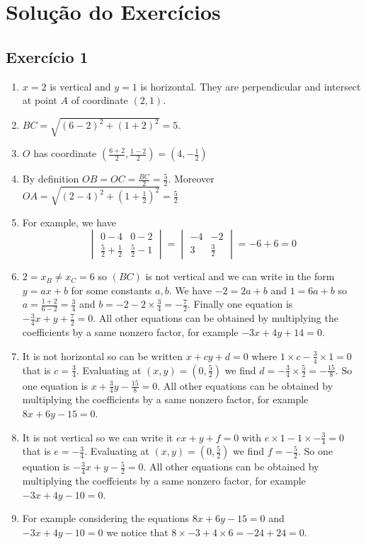 \section{Solução do Exercícios}

\subsection*{Exercício 1}

\begin{enumerate}
\item $x=2$ is vertical and $y=1$ is horizontal. They are perpendicular
  and intersect at point $A$ of coordinate $(2,1)$.
\item $BC= \sqrt{{(6-2)}^2 + {(1+2)}^2} = 5$.
\item
  $O$ has coordinate $\left(\frac{6+2}{2}, \frac{1-2}{2}\right)=
  \left(4, -\frac{1}{2}\right)$
\item By definition $OB=OC=\frac{BC}{2}=\frac{5}{2}$.
  Moreover $OA=\sqrt{{(2-4)}^2 + {(1+\frac{1}{2})}^2}=\frac{5}{2}$
\item For example, we have
  $$
\begin{vmatrix}
0 - 4 & 0-2 \\
\frac{5}{2} + \frac{1}{2} & \frac{5}{2}-1
\end{vmatrix} =
\begin{vmatrix}
-4 & -2 \\
3 & \frac{3}{2}
\end{vmatrix} = -6 + 6 = 0
$$
\item $2=x_B \neq x_C = 6$ so $(BC)$ is not vertical and we can write
  in the form $y = ax+b$ for some constants $a,b$.
  We have $-2=2a+b$ and $1=6a+b$ so $a = \frac{1+2}{6-2}  = \frac{3}{4}$
  and $b = -2 - 2 \times \frac{3}{4} = -\frac{7}{2}$.
  Finally one equation is
  $-\frac{3}{4} x + y + \frac{7}{2} = 0$. All other equations can be obtained
  by multiplying the coefficients by a same nonzero factor, for example
  $-3x+4y+14=0$.

\item It is not horizontal so can be written
  $x + cy + d =0$ where $1 \times c - \frac{3}{4} \times 1 = 0$ that is
  $c = \frac{3}{4}$. Evaluating at $(x,y)=\left(0,\frac{5}{2}\right)$ we find
  $d = -\frac{3}{4} \times \frac{5}{2} = -\frac{15}{8}$.
  So one equation is $x + \frac{3}{4}y - \frac{15}{8} = 0$.
  All other equations can be obtained
  by multiplying the coefficients by a same nonzero factor,
  for example $8x+6y-15=0$.

\item It is not vertical so we can write it $ex + y + f = 0$ with
  $e \times 1 -  1 \times {-\frac{3}{4}} = 0$ that is
  $e = -\frac{3}{4}$. Evaluating at $(x,y)=\left(0,\frac{5}{2}\right)$ we find
  $f = -\frac{5}{2}$. So one equation is
  $-\frac{3}{4} x + y -\frac{5}{2} = 0$.
  All other equations can be obtained
  by multiplying the coeffcients by a same nonzero factor,
  for example $-3x+4y-10=0$.

\item For example considering the equations $8x+6y-15=0$ and
  $-3x+4y-10=0$ we notice that $8\times-3+4\times6=-24+24=0$.

\end{enumerate}

